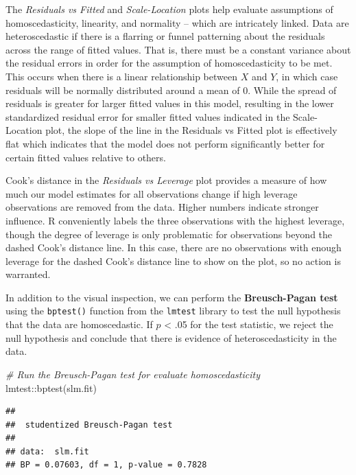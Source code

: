 \documentclass[
]{book}
\newenvironment{Shaded}{\begin{snugshade}}{\end{snugshade}}
\newcommand{\CommentTok}[1]{\textcolor[rgb]{0.56,0.35,0.01}{\textit{#1}}}
\newcommand{\FunctionTok}[1]{\textcolor[rgb]{0.00,0.00,0.00}{#1}}
\newcommand{\NormalTok}[1]{#1}
\newcommand{\SpecialCharTok}[1]{\textcolor[rgb]{0.00,0.00,0.00}{#1}}
\begin{document}
The \emph{Residuals vs Fitted} and \emph{Scale-Location} plots help evaluate assumptions of homoscedasticity, linearity, and normality -- which are intricately linked. Data are heteroscedastic if there is a flarring or funnel patterning about the residuals across the range of fitted values. That is, there must be a constant variance about the residual errors in order for the assumption of homoscedasticity to be met. This occurs when there is a linear relationship between \(X\) and \(Y\), in which case residuals will be normally distributed around a mean of 0. While the spread of residuals is greater for larger fitted values in this model, resulting in the lower standardized residual error for smaller fitted values indicated in the Scale-Location plot, the slope of the line in the Residuals vs Fitted plot is effectively flat which indicates that the model does not perform significantly better for certain fitted values relative to others.

Cook's distance in the \emph{Residuals vs Leverage} plot provides a measure of how much our model estimates for all observations change if high leverage observations are removed from the data. Higher numbers indicate stronger influence. R conveniently labels the three observations with the highest leverage, though the degree of leverage is only problematic for observations beyond the dashed Cook's distance line. In this case, there are no observations with enough leverage for the dashed Cook's distance line to show on the plot, so no action is warranted.

In addition to the visual inspection, we can perform the \textbf{Breusch-Pagan test} using the \texttt{bptest()} function from the \texttt{lmtest} library to test the null hypothesis that the data are homoscedastic. If \(p\) \textless{} .05 for the test statistic, we reject the null hypothesis and conclude that there is evidence of heteroscedasticity in the data.

\begin{Shaded}
\begin{Highlighting}[]
\CommentTok{\# Run the Breusch{-}Pagan test for evaluate homoscedasticity}
\NormalTok{lmtest}\SpecialCharTok{::}\FunctionTok{bptest}\NormalTok{(slm.fit)}
\end{Highlighting}
\end{Shaded}

\begin{verbatim}
## 
##  studentized Breusch-Pagan test
## 
## data:  slm.fit
## BP = 0.07603, df = 1, p-value = 0.7828
\end{verbatim}
\end{document}
